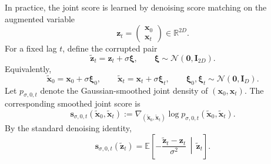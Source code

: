 \documentclass[11pt,twoside,fleqn]{article}
\begin{document}
In practice, the joint score is learned by denoising score matching on the
augmented variable
\begin{equation}
    \bm{z}_t
    =
    \begin{pmatrix}
        \bm{x}_0 \\
        \bm{x}_t
    \end{pmatrix}
    \in \mathbb{R}^{2D}.
    \label{eq:app_augmented_lagged_variable}
\end{equation}
For a fixed lag $t$, define the corrupted pair
\begin{equation}
    \widetilde{\bm{z}}_t
    =
    \bm{z}_t
    +
    \sigma \bm{\xi},
    \qquad
    \bm{\xi}\sim\mathcal{N}(\bm{0},\bm{I}_{2D}).
    \label{eq:app_joint_corruption}
\end{equation}
Equivalently,
\begin{equation}
    \widetilde{\bm{x}}_0
    =
    \bm{x}_0+\sigma\bm{\xi}_0,
    \qquad
    \widetilde{\bm{x}}_t
    =
    \bm{x}_t+\sigma\bm{\xi}_t,
    \qquad
    \bm{\xi}_0,\bm{\xi}_t\sim\mathcal{N}(\bm{0},\bm{I}_D).
    \label{eq:app_joint_corruption_blocks}
\end{equation}
Let $p_{\sigma,0,t}$ denote the Gaussian-smoothed joint density of
$(\bm{x}_0,\bm{x}_t)$. The corresponding smoothed joint score is
\begin{equation}
    \bm{s}_{\sigma,0,t}(\widetilde{\bm{x}}_0,\widetilde{\bm{x}}_t)
    :=
    \nabla_{(\widetilde{\bm{x}}_0,\widetilde{\bm{x}}_t)}
    \log p_{\sigma,0,t}(\widetilde{\bm{x}}_0,\widetilde{\bm{x}}_t).
    \label{eq:app_smoothed_joint_score}
\end{equation}
By the standard denoising identity,
\begin{equation}
    \bm{s}_{\sigma,0,t}(\widetilde{\bm{z}}_t)
    =
    \mathbb{E}
    \left[
        -\frac{\widetilde{\bm{z}}_t-\bm{z}_t}{\sigma^2}
        \,\middle|\,
        \widetilde{\bm{z}}_t
    \right].
    \label{eq:app_joint_denoising_identity}
\end{equation}
\end{document}
